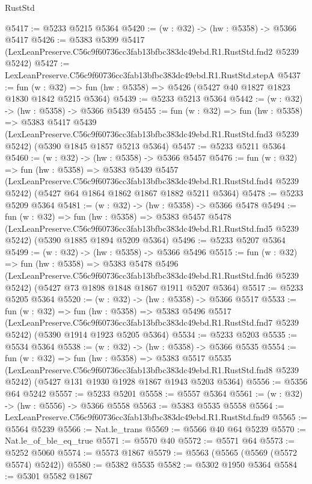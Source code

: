 \begin{lexlean}{RustStd}
\begin{coremodule}
@5417 := @5233 @5215 @5364
@5420 := (w : @32) -> (hw : @5358) -> @5366 @5417
@5426 := @5383
    @5399
    @5417
    (LexLeanPreserve.C56c9f60736cc3fab13bfbc383dc49ebd.R1.RustStd.fnd2 @5239 @5242)
@5427 := LexLeanPreserve.C56c9f60736cc3fab13bfbc383dc49ebd.R1.RustStd.stepA
@5437 := fun (w : @32) => fun (hw : @5358) => @5426 (@5427 @40 @1827 @1823 @1830 @1842 @5215 @5364)
@5439 := @5233 @5213 @5364
@5442 := (w : @32) -> (hw : @5358) -> @5366 @5439
@5455 := fun (w : @32) =>
  fun (hw : @5358) =>
  @5383
    @5417
    @5439
    (LexLeanPreserve.C56c9f60736cc3fab13bfbc383dc49ebd.R1.RustStd.fnd3 @5239 @5242)
    (@5390 @1845 @1857 @5213 @5364)
@5457 := @5233 @5211 @5364
@5460 := (w : @32) -> (hw : @5358) -> @5366 @5457
@5476 := fun (w : @32) =>
  fun (hw : @5358) =>
  @5383
    @5439
    @5457
    (LexLeanPreserve.C56c9f60736cc3fab13bfbc383dc49ebd.R1.RustStd.fnd4 @5239 @5242)
    (@5427 @64 @1864 @1862 @1867 @1882 @5211 @5364)
@5478 := @5233 @5209 @5364
@5481 := (w : @32) -> (hw : @5358) -> @5366 @5478
@5494 := fun (w : @32) =>
  fun (hw : @5358) =>
  @5383
    @5457
    @5478
    (LexLeanPreserve.C56c9f60736cc3fab13bfbc383dc49ebd.R1.RustStd.fnd5 @5239 @5242)
    (@5390 @1885 @1894 @5209 @5364)
@5496 := @5233 @5207 @5364
@5499 := (w : @32) -> (hw : @5358) -> @5366 @5496
@5515 := fun (w : @32) =>
  fun (hw : @5358) =>
  @5383
    @5478
    @5496
    (LexLeanPreserve.C56c9f60736cc3fab13bfbc383dc49ebd.R1.RustStd.fnd6 @5239 @5242)
    (@5427 @73 @1898 @1848 @1867 @1911 @5207 @5364)
@5517 := @5233 @5205 @5364
@5520 := (w : @32) -> (hw : @5358) -> @5366 @5517
@5533 := fun (w : @32) =>
  fun (hw : @5358) =>
  @5383
    @5496
    @5517
    (LexLeanPreserve.C56c9f60736cc3fab13bfbc383dc49ebd.R1.RustStd.fnd7 @5239 @5242)
    (@5390 @1914 @1923 @5205 @5364)
@5534 := @5233 @5203
@5535 := @5534 @5364
@5538 := (w : @32) -> (hw : @5358) -> @5366 @5535
@5554 := fun (w : @32) =>
  fun (hw : @5358) =>
  @5383
    @5517
    @5535
    (LexLeanPreserve.C56c9f60736cc3fab13bfbc383dc49ebd.R1.RustStd.fnd8 @5239 @5242)
    (@5427 @131 @1930 @1928 @1867 @1943 @5203 @5364)
@5556 := @5356 @64 @5242
@5557 := @5233 @5201
@5558 := @5557 @5364
@5561 := (w : @32) -> (hw : @5556) -> @5366 @5558
@5563 := @5383 @5535 @5558
@5564 := LexLeanPreserve.C56c9f60736cc3fab13bfbc383dc49ebd.R1.RustStd.fnd9
@5565 := @5564 @5239
@5566 := Nat.le_trans
@5569 := @5566 @40 @64 @5239
@5570 := Nat.le_of_ble_eq_true
@5571 := @5570 @40
@5572 := @5571 @64
@5573 := @5252 @5060
@5574 := @5573 @1867
@5579 := @5563 (@5565 (@5569 (@5572 @5574) @5242))
@5580 := @5382 @5535
@5582 := @5302 @1950 @5364
@5584 := @5301 @5582 @1867

\end{coremodule}
\end{lexlean}

